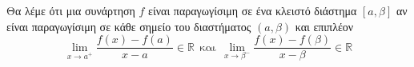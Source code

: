 Θα λέμε ότι μια συνάρτηση $ f $ είναι παραγωγίσιμη σε ένα κλειστό διάστημα $ [a,\beta] $ αν είναι παραγωγίσιμη σε κάθε σημείο του διαστήματος $ (a,\beta) $ και επιπλέον
\[ \lim_{x\to a^+}{\frac{f(x)-f(a)}{x-a}}\in\mathbb{R}\ \ \textrm{και}\ \ \lim_{x\to \beta^-}{\frac{f(x)-f(\beta)}{x-\beta}}\in\mathbb{R} \]
